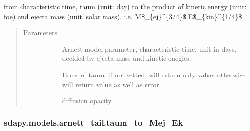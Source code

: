 \documentclass[letterpaper,10pt,english]{sphinxmanual}
\begin{document}
\begin{fulllineitems}
\label{\detokenize{generated/sdapy.models.arnett_tail.taum_to_MejEk:sdapy.models.arnett_tail.taum_to_MejEk}}
from characteristic time, taum (unit: day) to the product of kinetic energy (unit: foe) and ejecta mass (unit: solar mass),
i.e. M\$\_\{ej\}\textasciicircum{}\{3/4\}\$ E\$\_\{kin\}\textasciicircum{}\{\sphinxhyphen{}1/4\}\$
\begin{quote}\begin{description}
\item[{Parameters}] \leavevmode\begin{description}
\item[{}] \leavevmode{[}\sphinxtitleref{float}{]}
Arnett model parameter, characteristic time, unit in days, decided by ejecta mass and kinetic enegies.

\item[{}] \leavevmode{[}\sphinxtitleref{float}{]}
Error of taum, if not setted, will return only value, otherwise will return value as well as error.

\item[{}] \leavevmode{[}\sphinxtitleref{float}{]}
diffusion opacity

\end{description}

\end{description}\end{quote}

\end{fulllineitems}



\subsubsection{sdapy.models.arnett\_tail.taum\_to\_Mej\_Ek}
\label{\detokenize{generated/sdapy.models.arnett_tail.taum_to_Mej_Ek:sdapy-models-arnett-tail-taum-to-mej-ek}}\label{\detokenize{generated/sdapy.models.arnett_tail.taum_to_Mej_Ek::doc}}
\end{document}
